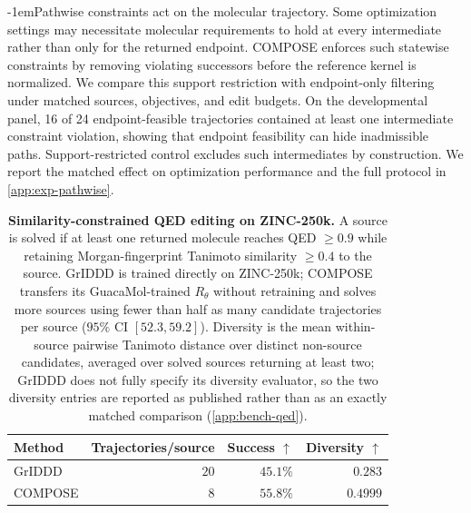 \documentclass{article}
\makeatletter
\theoremstyle{definition}
\theoremstyle{remark}
\def\paragraph{\@startsection{paragraph}{4}{\z@}{1.0ex plus 0.3ex minus .2ex}%
  {-1em}{\normalsize\bf}}
\makeatother
\begin{document}
\paragraph{Pathwise constraints act on the molecular trajectory.}
Some optimization settings may necessitate molecular requirements to hold at every intermediate rather than only for the returned endpoint. COMPOSE enforces such statewise constraints by removing
violating successors before the reference kernel is normalized. We compare this
support restriction with endpoint-only filtering under matched sources,
objectives, and edit budgets. On the developmental panel, 16 of 24 endpoint-feasible trajectories contained at least one intermediate constraint violation, showing that endpoint feasibility
can hide inadmissible paths. Support-restricted control excludes such
intermediates by construction. We report the matched effect on optimization
performance and the full protocol in \cref{app:exp-pathwise}.

\begin{table}[!ht]
\centering\small\setlength{\tabcolsep}{7pt}
\begin{tabular}{@{}lrrr@{}}
\toprule
Method & Trajectories/source & Success $\uparrow$ & Diversity $\uparrow$ \\
\midrule
GrIDDD  & $20$ & $45.1\%$          & $0.283$ \\
COMPOSE & $8$  & $\mathbf{55.8\%}$ & $\mathbf{0.4999}$ \\
\bottomrule
\end{tabular}
\caption{\small\textbf{Similarity-constrained QED editing on ZINC-250k.} A source
is solved if at least one returned molecule reaches QED $\geq0.9$ while retaining
Morgan-fingerprint Tanimoto similarity $\geq0.4$ to the source. GrIDDD is trained
directly on ZINC-250k; COMPOSE transfers its GuacaMol-trained $R_\theta$ without
retraining and solves more sources using fewer than half as many candidate
trajectories per source ($95\%$ CI $[52.3,59.2]$). Diversity is the mean
within-source pairwise Tanimoto distance over distinct non-source candidates,
averaged over solved sources returning at least two; GrIDDD does not fully
specify its diversity evaluator, so the two diversity entries are reported as
published rather than as an exactly matched comparison (\cref{app:bench-qed}).}
\label{tab:external}
\end{table}
\end{document}

